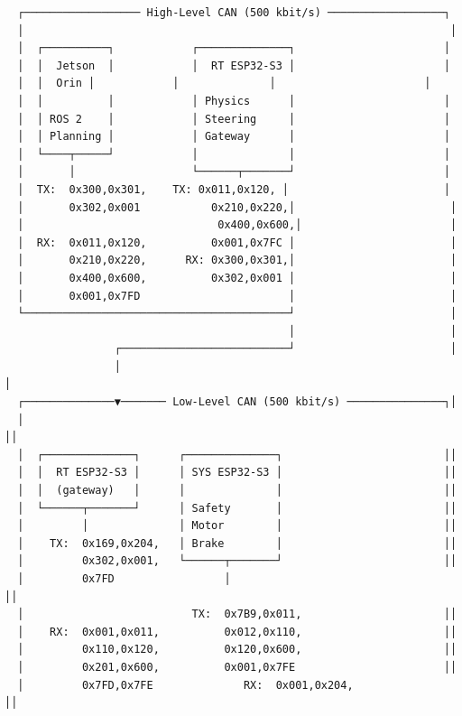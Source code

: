 \documentclass[12pt,a4paper,oneside]{report}
\begin{document}
\begin{verbatim}
  ┌────────────────── High-Level CAN (500 kbit/s) ──────────────────┐
  │                                                                  │
  │  ┌──────────┐            ┌──────────────┐                       │
  │  │  Jetson  │            │  RT ESP32-S3 │                       │
  │  │  Orin │            │              │                       │
  │  │          │            │ Physics      │                       │
  │  │ ROS 2    │            │ Steering     │                       │
  │  │ Planning │            │ Gateway      │                       │
  │  └────┬─────┘            │              │                       │
  │       │                  └──────┬───────┘                       │
  │  TX:  0x300,0x301,    TX: 0x011,0x120, │                        │
  │       0x302,0x001           0x210,0x220,│                        │
  │                              0x400,0x600,│                       │
  │  RX:  0x011,0x120,          0x001,0x7FC │                        │
  │       0x210,0x220,      RX: 0x300,0x301,│                        │
  │       0x400,0x600,          0x302,0x001 │                        │
  │       0x001,0x7FD                       │                        │
  └─────────────────────────────────────────┘                        │
                                            │                        │
                 ┌──────────────────────────┘                        │
                 │                                                    │
  ┌──────────────▼─────── Low-Level CAN (500 kbit/s) ───────────────┐│
  │                                                                  ││
  │  ┌──────────────┐      ┌──────────────┐                         ││
  │  │  RT ESP32-S3 │      │ SYS ESP32-S3 │                         ││
  │  │  (gateway)   │      │              │                         ││
  │  └──────┬───────┘      │ Safety       │                         ││
  │         │              │ Motor        │                         ││
  │    TX:  0x169,0x204,   │ Brake        │                         ││
  │         0x302,0x001,   └──────┬───────┘                         ││
  │         0x7FD                 │                                  ││
  │                          TX:  0x7B9,0x011,                      ││
  │    RX:  0x001,0x011,          0x012,0x110,                      ││
  │         0x110,0x120,          0x120,0x600,                      ││
  │         0x201,0x600,          0x001,0x7FE                       ││
  │         0x7FD,0x7FE              RX:  0x001,0x204,                    ││

\end{verbatim}
\end{document}
